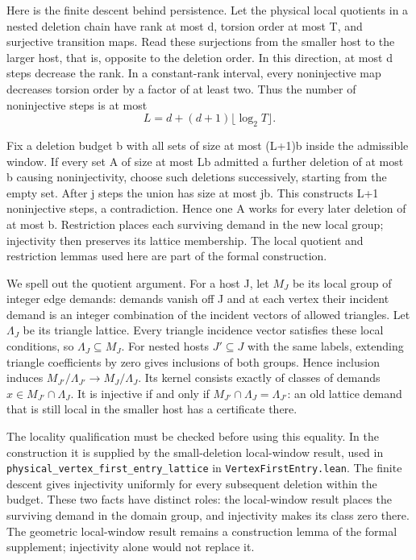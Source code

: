 \documentclass[english,11pt,a4paper]{article}
\begin{document}
Here is the finite descent behind persistence. Let the physical local quotients in a nested deletion chain have rank at most d, torsion order at most T, and surjective transition maps. Read these surjections from the smaller host to the larger host, that is, opposite to the deletion order. In this direction, at most d steps decrease the rank. In a constant-rank interval, every noninjective map decreases torsion order by a factor of at least two. Thus the number of noninjective steps is at most
\[L=d+(d+1)\lfloor\log_2T\rfloor. \tag{D.1}\]

Fix a deletion budget b with all sets of size at most (L+1)b inside the admissible window. If every set A of size at most Lb admitted a further deletion of at most b causing noninjectivity, choose such deletions successively, starting from the empty set. After j steps the union has size at most jb. This constructs L+1 noninjective steps, a contradiction. Hence one A works for every later deletion of at most b. Restriction places each surviving demand in the new local group; injectivity then preserves its lattice membership. The local quotient and restriction lemmas used here are part of the formal construction.

We spell out the quotient argument. For a host J, let \(M_J\) be its local group of integer edge demands: demands vanish off J and at each vertex their incident demand is an integer combination of the incident vectors of allowed triangles. Let \(\Lambda_J\) be its triangle lattice. Every triangle incidence vector satisfies these local conditions, so \(\Lambda_J\subseteq M_J\). For nested hosts \(J'\subseteq J\) with the same labels, extending triangle coefficients by zero gives inclusions of both groups. Hence inclusion induces \(M_{J'}/\Lambda_{J'}\longrightarrow M_J/\Lambda_J\). Its kernel consists exactly of classes of demands \(x\in M_{J'}\cap\Lambda_J\). It is injective if and only if \(M_{J'}\cap\Lambda_J=\Lambda_{J'}\): an old lattice demand that is still local in the smaller host has a certificate there.

The locality qualification must be checked before using this equality. In the construction it is supplied by the small-deletion local-window result, used in \texttt{physical\_\allowbreak{}vertex\_\allowbreak{}first\_\allowbreak{}entry\_\allowbreak{}lattice} in \texttt{Vertex\allowbreak{}First\allowbreak{}Entry.\allowbreak{}lean}. The finite descent gives injectivity uniformly for every subsequent deletion within the budget. These two facts have distinct roles: the local-window result places the surviving demand in the domain group, and injectivity makes its class zero there. The geometric local-window result remains a construction lemma of the formal supplement; injectivity alone would not replace it.
\end{document}
